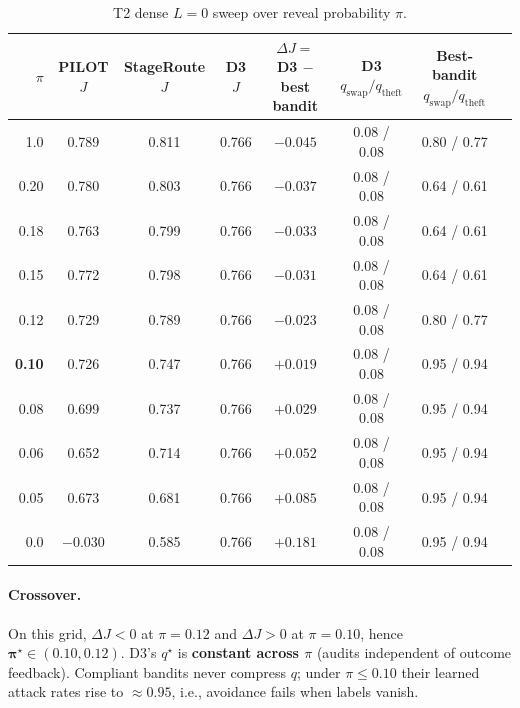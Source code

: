 \documentclass[sigconf,review]{acmart}
\newcommand{\qstar}{q^\star}
\newcommand{\pistar}{\pi^\star}
\begin{document}
\begin{table}[t]
\caption{T2 dense $L=0$ sweep over reveal probability $\pi$.}
\label{tab:t2}
\small
\begin{tabular}{@{}rccccccc@{}}
\toprule
$\pi$ & PILOT $J$ & StageRoute $J$ & D3 $J$ & $\Delta J=$ D3 $-$ best bandit & D3 $q_{\mathrm{swap}}/q_{\mathrm{theft}}$ & Best-bandit $q_{\mathrm{swap}}/q_{\mathrm{theft}}$ \\
\midrule
1.0 & 0.789 & 0.811 & 0.766 & $-0.045$ & 0.08 / 0.08 & 0.80 / 0.77 \\
0.20 & 0.780 & 0.803 & 0.766 & $-0.037$ & 0.08 / 0.08 & 0.64 / 0.61 \\
0.18 & 0.763 & 0.799 & 0.766 & $-0.033$ & 0.08 / 0.08 & 0.64 / 0.61 \\
0.15 & 0.772 & 0.798 & 0.766 & $-0.031$ & 0.08 / 0.08 & 0.64 / 0.61 \\
0.12 & 0.729 & 0.789 & 0.766 & $-0.023$ & 0.08 / 0.08 & 0.80 / 0.77 \\
\textbf{0.10} & 0.726 & 0.747 & 0.766 & $\mathbf{+0.019}$ & 0.08 / 0.08 & 0.95 / 0.94 \\
0.08 & 0.699 & 0.737 & 0.766 & $+0.029$ & 0.08 / 0.08 & 0.95 / 0.94 \\
0.06 & 0.652 & 0.714 & 0.766 & $+0.052$ & 0.08 / 0.08 & 0.95 / 0.94 \\
0.05 & 0.673 & 0.681 & 0.766 & $+0.085$ & 0.08 / 0.08 & 0.95 / 0.94 \\
0.0 & $-0.030$ & 0.585 & 0.766 & $+0.181$ & 0.08 / 0.08 & 0.95 / 0.94 \\
\bottomrule
\end{tabular}
\end{table}

\paragraph{Crossover.} On this grid, $\Delta J < 0$ at $\pi=0.12$ and $\Delta J > 0$ at $\pi=0.10$, hence $\boldsymbol{\pistar \in (0.10, 0.12)}$. D3's $\qstar$ is \textbf{constant across $\pi$} (audits independent of outcome feedback). Compliant bandits never compress $q$; under $\pi \le 0.10$ their learned attack rates rise to $\approx 0.95$, i.e., avoidance fails when labels vanish.
\end{document}
